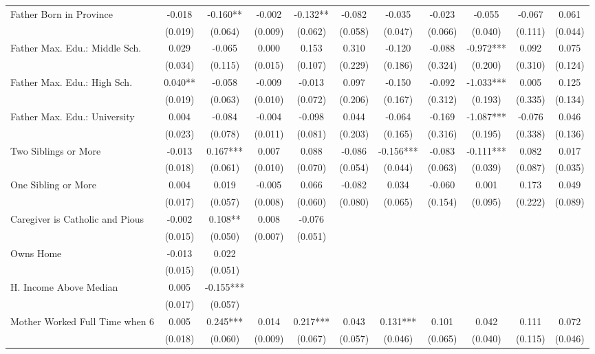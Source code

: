 \begin{tabular}{lcccccccccc}
Father Born in Province & -0.018 & -0.160** & -0.002 & -0.132** & -0.082 & -0.035 & -0.023 & -0.055 & -0.067 & 0.061 \\
 & (0.019) & (0.064) & (0.009) & (0.062) & (0.058) & (0.047) & (0.066) & (0.040) & (0.111) & (0.044) \\
Father Max. Edu.: Middle Sch. & 0.029 & -0.065 & 0.000 & 0.153 & 0.310 & -0.120 & -0.088 & -0.972*** & 0.092 & 0.075 \\
 & (0.034) & (0.115) & (0.015) & (0.107) & (0.229) & (0.186) & (0.324) & (0.200) & (0.310) & (0.124) \\
Father Max. Edu.: High Sch. & 0.040** & -0.058 & -0.009 & -0.013 & 0.097 & -0.150 & -0.092 & -1.033*** & 0.005 & 0.125 \\
 & (0.019) & (0.063) & (0.010) & (0.072) & (0.206) & (0.167) & (0.312) & (0.193) & (0.335) & (0.134) \\
Father Max. Edu.: University & 0.004 & -0.084 & -0.004 & -0.098 & 0.044 & -0.064 & -0.169 & -1.087*** & -0.076 & 0.046 \\
 & (0.023) & (0.078) & (0.011) & (0.081) & (0.203) & (0.165) & (0.316) & (0.195) & (0.338) & (0.136) \\
Two Siblings or More & -0.013 & 0.167*** & 0.007 & 0.088 & -0.086 & -0.156*** & -0.083 & -0.111*** & 0.082 & 0.017 \\
 & (0.018) & (0.061) & (0.010) & (0.070) & (0.054) & (0.044) & (0.063) & (0.039) & (0.087) & (0.035) \\
One Sibling or More & 0.004 & 0.019 & -0.005 & 0.066 & -0.082 & 0.034 & -0.060 & 0.001 & 0.173 & 0.049 \\
 & (0.017) & (0.057) & (0.008) & (0.060) & (0.080) & (0.065) & (0.154) & (0.095) & (0.222) & (0.089) \\
Caregiver is Catholic and Pious & -0.002 & 0.108** & 0.008 & -0.076 &  &  &  &  &  &  \\
 & (0.015) & (0.050) & (0.007) & (0.051) &  &  &  &  &  &  \\
Owns Home & -0.013 & 0.022 &  &  &  &  &  &  &  &  \\
 & (0.015) & (0.051) &  &  &  &  &  &  &  &  \\
H. Income Above Median & 0.005 & -0.155*** &  &  &  &  &  &  &  &  \\
 & (0.017) & (0.057) &  &  &  &  &  &  &  &  \\
Mother Worked Full Time when 6 & 0.005 & 0.245*** & 0.014 & 0.217*** & 0.043 & 0.131*** & 0.101 & 0.042 & 0.111 & 0.072 \\
 & (0.018) & (0.060) & (0.009) & (0.067) & (0.057) & (0.046) & (0.065) & (0.040) & (0.115) & (0.046) \\

\end{tabular}
